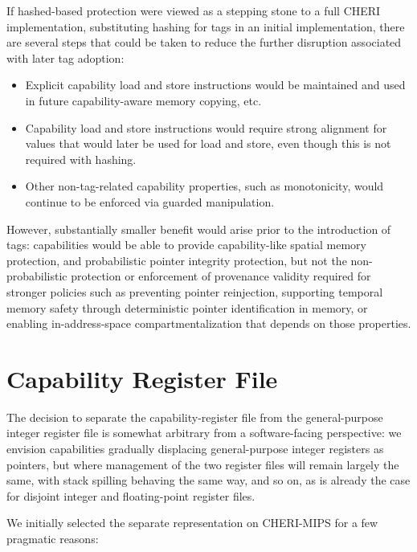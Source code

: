 If hashed-based protection were viewed as a stepping stone to a full CHERI
implementation, substituting hashing for tags in an initial implementation,
there are several steps that could be taken to reduce the further disruption
associated with later tag adoption:

\begin{itemize}
\item Explicit capability load and store instructions would be maintained and
  used in future capability-aware memory copying, etc.

\item Capability load and store instructions would require strong alignment
  for values that would later be used for load and store, even though this is
  not required with hashing.

\item Other non-tag-related capability properties, such as monotonicity, would
  continue to be enforced via guarded manipulation.
\end{itemize}

However, substantially smaller benefit would arise prior to the introduction
of tags: capabilities would be able to provide capability-like spatial memory
protection, and probabilistic pointer integrity protection, but not the
non-probabilistic protection or enforcement of provenance validity required
for stronger policies such as preventing pointer reinjection, supporting
temporal memory safety through deterministic pointer identification in memory,
or enabling in-address-space compartmentalization that depends on those
properties.

\section{Capability Register File}

The decision to separate the capability-register file from the general-purpose
integer
register file is somewhat arbitrary from a software-facing perspective: we
envision capabilities gradually displacing general-purpose integer registers as
pointers, but where management of the two register files will remain largely
the same, with stack spilling behaving the same way, and so on, as is already
the case for disjoint integer and floating-point register files.

We initially selected the separate representation on CHERI-MIPS for a
few pragmatic reasons:

